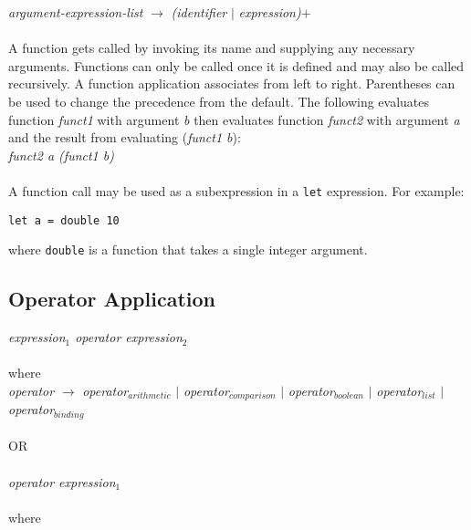     \emph{argument-expression-list} $\rightarrow$ \emph{(identifier} $|$ \emph{expression)}$+$ \\ \\ 
    A function gets called by invoking its name and supplying any necessary arguments. Functions can only be called once it is defined and may also be called recursively. A function application associates from left to right. Parentheses can be used to change the precedence from the default. The following evaluates function \emph{funct1} with argument \emph{b} then 
    evaluates function \emph{funct2} with argument \emph{a} and the result from evaluating (\emph{funct1 b}): \\
    
    \emph{funct2 a (funct1 b)}\\ \\
A function call may be used as a subexpression in a \texttt{let} expression. For example:
\begin{verbatim}
let a = double 10
\end{verbatim}
where \texttt{double} is a function that takes a single integer argument. 

\subsection{Operator Application}
    \emph{expression$_{1}$  operator  expression$_{2}$}\\ \\
    where\\
    
    \emph{operator} $\rightarrow$ 
        \emph{operator$_{arithmetic}$} $|$
        \emph{operator$_{comparison}$}  $|$ 
        \emph{operator$_{boolean}$}  $|$
        \emph{operator$_{list}$}  $|$
        \emph{operator$_{binding}$} \\ \\
OR\\ \\
          \emph{operator  expression$_{1}$}\\ \\
    where\\
    
